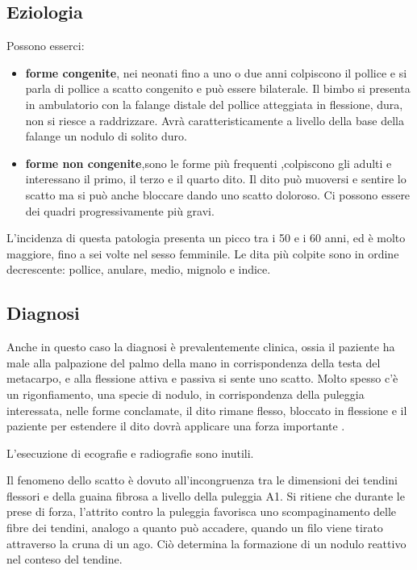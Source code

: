 \subsection{Eziologia}

Possono esserci:

\begin{itemize}
\item
  \textbf{forme congenite}, nei neonati fino a uno o due anni colpiscono il pollice e si parla di pollice a scatto congenito e può essere bilaterale.
Il bimbo si presenta in ambulatorio con la falange distale del pollice atteggiata in flessione, dura, non si riesce a raddrizzare. Avrà caratteristicamente a livello della base della falange un nodulo di solito duro.
\item
  \textbf{forme non congenite},sono le forme più frequenti ,colpiscono gli adulti e interessano il primo, il terzo e il quarto dito. Il dito può muoversi e sentire lo scatto ma si può anche bloccare dando uno scatto doloroso. Ci possono essere dei quadri progressivamente più gravi.
\end{itemize}

L'incidenza di questa patologia presenta un picco tra i 50 e i 60 anni, ed è molto maggiore, fino a sei volte nel sesso femminile. Le dita più colpite sono in ordine decrescente: pollice, anulare, medio, mignolo e indice.

\subsection{Diagnosi}

Anche in questo caso la diagnosi è prevalentemente clinica, ossia il paziente ha male alla palpazione del palmo della mano in corrispondenza della testa del metacarpo, e alla flessione attiva e passiva si sente uno scatto. Molto spesso c'è un rigonfiamento, una specie di nodulo, in corrispondenza della puleggia interessata, nelle forme conclamate, il
dito rimane flesso, bloccato in flessione e il paziente per estendere il dito dovrà applicare una forza importante .

L'esecuzione di ecografie e radiografie sono inutili.

Il fenomeno dello scatto è dovuto all'incongruenza tra le dimensioni dei tendini flessori e della guaina fibrosa a livello della puleggia A1. Si
ritiene che durante le prese di forza, l'attrito contro la puleggia favorisca uno scompaginamento delle fibre dei tendini, analogo a quanto può accadere, quando un filo viene tirato attraverso la cruna di un ago.
Ciò determina la formazione di un nodulo reattivo nel conteso del tendine.


